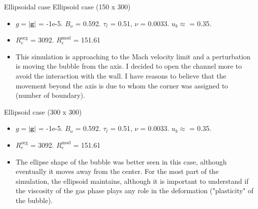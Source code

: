 \documentclass[9pt]{beamer}
\begin{document}
	\begin{frame}[t]{Ellipsoidal case}
		Ellipsoid case (150 x 300)
		\begin{itemize}
			\item $g = \vert \mathbf{g}\vert $ = -1e-5. $B_o$ = 0.592. $\tau_l$ = 0.51, $\nu$ = 0.0033. $u_b \approx$ = 0.35. 
			\item $R_e^{\text{org}}$ = 3092. $R_e^{\text{mod}}$ = 151.61
			\item This simulation is approaching to the Mach velocity limit and a perturbation is moving the bubble from the axis. I decided to open the channel more to avoid the interaction with the wall. I have reasons to believe that the movement beyond the axis is due to whom the corner was assigned to (number of boundary).
		\end{itemize}
		Ellipsoid case (300 x 300)
		\begin{itemize}
			\item $g = \vert \mathbf{g}\vert $ = -1e-5. $B_o$ = 0.592. $\tau_l$ = 0.51, $\nu$ = 0.0033. $u_b \approx$ = 0.35. 
			\item $R_e^{\text{org}}$ = 3092. $R_e^{\text{mod}}$ = 151.61
			
			\item The ellipse shape of the bubble was better seen in this case, although eventually it moves away from the center. For the most part of the simulation, the ellipsoid maintains, although it is important to understand if the viscosity of the gas phase plays any role in the deformation ("plasticity" of the bubble).
		\end{itemize}
	\end{frame}
\end{document}
